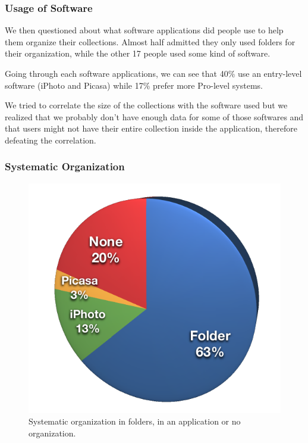 \subsubsection{Usage of Software} %
\label{ssub:usage_of_software}

We then questioned about what software applications did people use to help them organize their collections. Almost half admitted they only used folders for their organization, while the other 17 people used some kind of software.

Going through each software applications, we can see that 40\% use an entry-level software (iPhoto and Picasa) while 17\% prefer more Pro-level systems.

We tried to correlate the size of the collections with the software used but we realized that we probably don't have enough data for some of those softwares and that users might not have their entire collection inside the application, therefore defeating the correlation.


\pagebreak


\subsubsection{Systematic Organization} %
\label{ssub:systematic_organization}

\begin{figure}
	\vspace{-20pt}
	\begin{center}
		\includegraphics[width=\linewidth]{Figures/survey/organization}
	\end{center}
	\vspace{-20pt}
	\caption{Systematic organization in folders, in an application or no organization.}
	\vspace{-5pt}
	\label{fig:us:org}
\end{figure}


